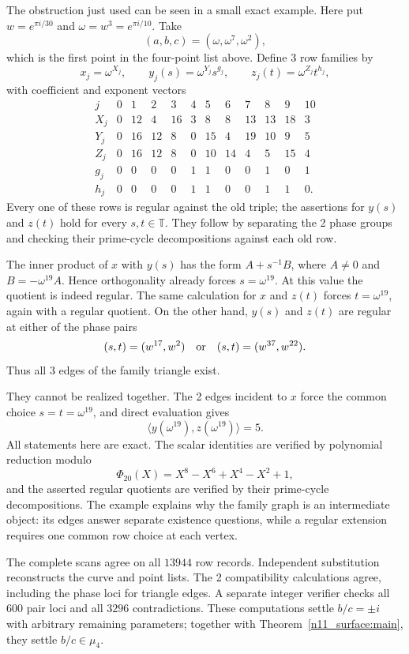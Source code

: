 \documentclass[11pt,a4paper]{article}
\theoremstyle{plain}
\theoremstyle{definition}
\theoremstyle{plain}
\begin{document}
\medskip
The obstruction just used can be seen in a small exact example. Here put $w=e^{\pi i/30}$ and $\omega=w^3=e^{\pi i/10}$. Take
$$(a,b,c)=(\omega,\omega^{7},\omega^{2}),$$
which is the first point in the four-point list above. Define 3 row families by
\[
x_j=\omega^{X_j},\qquad y_j(s)=\omega^{Y_j}s^{g_j},\qquad
z_j(t)=\omega^{Z_j}t^{h_j},
\]
with coefficient and exponent vectors
\[
\begin{array}{c|rrrrrrrrrrr}
j&0&1&2&3&4&5&6&7&8&9&10\\\hline
X_j&0&12&4&16&3&8&8&13&13&18&3\\
Y_j&0&16&12&8&0&15&4&19&10&9&5\\
Z_j&0&16&12&8&0&10&14&4&5&15&4\\
g_j&0&0&0&0&1&1&0&0&1&0&1\\
h_j&0&0&0&0&1&1&0&0&1&1&0.
\end{array}
\]
Every one of these rows is regular against the old triple; the assertions for $y(s)$ and $z(t)$ hold for every $s,t\in\mathbb T$. They follow by separating the 2 phase groups and checking their prime-cycle decompositions against each old row.

The inner product of $x$ with $y(s)$ has the form $A+s^{-1}B$, where $A\ne0$ and $B=-\omega^{19}A$. Hence orthogonality already forces $s=\omega^{19}$. At this value the quotient is indeed regular. The same calculation for $x$ and $z(t)$ forces $t=\omega^{19}$, again with a regular quotient. On the other hand, $y(s)$ and $z(t)$ are regular at either of the phase pairs
\[
(s,t)=(w^{17},w^{2})
\quad\hbox{or}\quad
(s,t)=(w^{37},w^{22}).
\]
Thus all 3 edges of the family triangle exist.

They cannot be realized together. The 2 edges incident to $x$ force the common choice $s=t=\omega^{19}$, and direct evaluation gives
\[
\langle y(\omega^{19}),z(\omega^{19})\rangle=5.
\]
All statements here are exact. The scalar identities are verified by polynomial reduction modulo
$$\Phi_{20}(X)=X^8-X^6+X^4-X^2+1,$$
and the asserted regular quotients are verified by their prime-cycle decompositions. The example explains why the family graph is an intermediate object: its edges answer separate existence questions, while a regular extension requires one common row choice at each vertex.

\medskip

The complete scans agree on all $13944$ row records. Independent substitution reconstructs the curve and point lists. The 2 compatibility calculations agree, including the phase loci for triangle edges. A separate integer verifier checks all $600$ pair loci and all $3296$ contradictions. These computations settle $b/c=\pm i$ with arbitrary remaining parameters; together with Theorem~\ref{n11_surface:main}, they settle $b/c\in\mu_4$.
\end{document}
